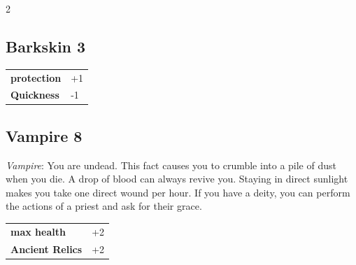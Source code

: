 \begin{multicols}{2}
\begin{tcolorbox}

\end{tcolorbox}

\begin{tcolorbox}
    \subsection*{Barkskin \hfill \small{3 }}
    \tcblower




\begin{tabular}{@{}ll@{}}
    \textbf{protection} & +1\\
    \textbf{Quickness} & -1\\
\end{tabular}


\end{tcolorbox}

\begin{tcolorbox}
    \subsection*{Vampire \hfill \small{8 }}
    \tcblower
\textit{Vampire}: You are undead. This fact causes you to crumble into a pile of dust when you die. A drop of blood can always revive you. Staying in direct sunlight makes you take one direct wound per hour. If you have a deity, you can perform the actions of a priest and ask for their grace.


\vspace{3mm}

\begin{tabular}{@{}ll@{}}
    \textbf{max health} & +2\\
    \textbf{Ancient Relics} & +2\\
\end{tabular}


\end{tcolorbox}

\begin{tcolorbox}

\end{tcolorbox}
\end{multicols}
